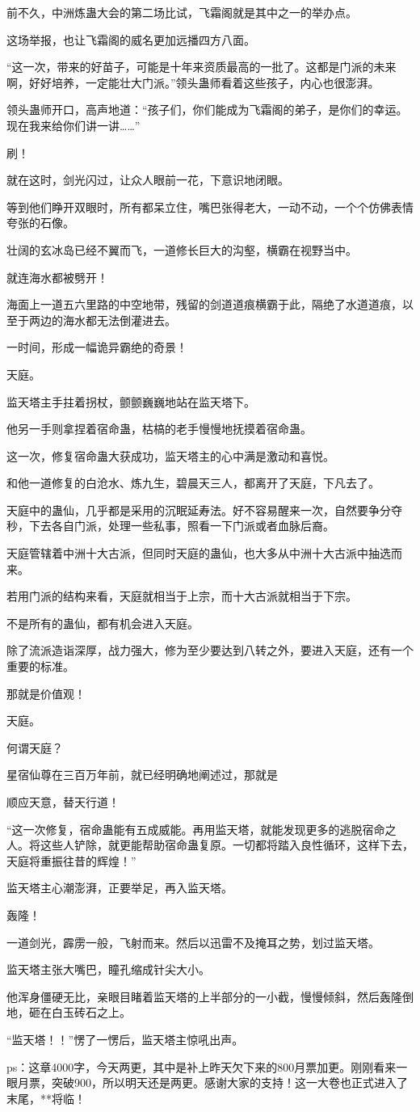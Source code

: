 \begin{this_body}
前不久，中洲炼蛊大会的第二场比试，飞霜阁就是其中之一的举办点。

这场举报，也让飞霜阁的威名更加远播四方八面。

“这一次，带来的好苗子，可能是十年来资质最高的一批了。这都是门派的未来啊，好好培养，一定能壮大门派。”领头蛊师看着这些孩子，内心也很澎湃。

领头蛊师开口，高声地道：“孩子们，你们能成为飞霜阁的弟子，是你们的幸运。现在我来给你们讲一讲……”

刷！

就在这时，剑光闪过，让众人眼前一花，下意识地闭眼。

等到他们睁开双眼时，所有都呆立住，嘴巴张得老大，一动不动，一个个仿佛表情夸张的石像。

壮阔的玄冰岛已经不翼而飞，一道修长巨大的沟壑，横霸在视野当中。

就连海水都被劈开！

海面上一道五六里路的中空地带，残留的剑道道痕横霸于此，隔绝了水道道痕，以至于两边的海水都无法倒灌进去。

一时间，形成一幅诡异霸绝的奇景！

天庭。

监天塔主手拄着拐杖，颤颤巍巍地站在监天塔下。

他另一手则拿捏着宿命蛊，枯槁的老手慢慢地抚摸着宿命蛊。

这一次，修复宿命蛊大获成功，监天塔主的心中满是激动和喜悦。

和他一道修复的白沧水、炼九生，碧晨天三人，都离开了天庭，下凡去了。

天庭中的蛊仙，几乎都是采用的沉眠延寿法。好不容易醒来一次，自然要争分夺秒，下去各自门派，处理一些私事，照看一下门派或者血脉后裔。

天庭管辖着中洲十大古派，但同时天庭的蛊仙，也大多从中洲十大古派中抽选而来。

若用门派的结构来看，天庭就相当于上宗，而十大古派就相当于下宗。

不是所有的蛊仙，都有机会进入天庭。

除了流派造诣深厚，战力强大，修为至少要达到八转之外，要进入天庭，还有一个重要的标准。

那就是价值观！

天庭。

何谓天庭？

星宿仙尊在三百万年前，就已经明确地阐述过，那就是

顺应天意，替天行道！

“这一次修复，宿命蛊能有五成威能。再用监天塔，就能发现更多的逃脱宿命之人。将这些人铲除，就更能帮助宿命蛊复原。一切都将踏入良性循环，这样下去，天庭将重振往昔的辉煌！”

监天塔主心潮澎湃，正要举足，再入监天塔。

轰隆！

一道剑光，霹雳一般，飞射而来。然后以迅雷不及掩耳之势，划过监天塔。

监天塔主张大嘴巴，瞳孔缩成针尖大小。

他浑身僵硬无比，亲眼目睹着监天塔的上半部分的一小截，慢慢倾斜，然后轰隆倒地，砸在白玉砖石之上。

“监天塔！！”愣了一愣后，监天塔主惊吼出声。

ps：这章4000字，今天两更，其中是补上昨天欠下来的800月票加更。刚刚看来一眼月票，突破900，所以明天还是两更。感谢大家的支持！这一大卷也正式进入了末尾，**将临！

\end{this_body}


